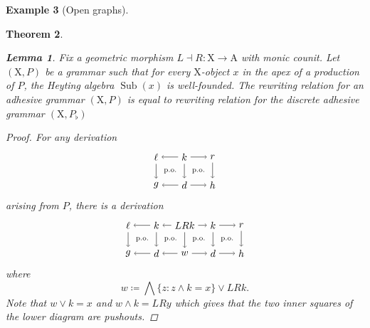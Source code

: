 \documentclass{amsart}
\newcommand{\A}{\cat{A}}
\newcommand{\X}{\cat{X}}
\newcommand{\cat}[1]{\mathrm{#1}}
\newcommand{\from}{\colon}
\DeclareMathOperator{\Sub}{Sub}
\newtheorem{theorem}{Theorem}[section]
\newtheorem{lemma}[theorem]{Lemma}
\theoremstyle{remark}
\theoremstyle{definition}
\newtheorem{example}[theorem]{Example}
\begin{document}
\begin{example}[Open graphs]
{{\begin{theorem}
\begin{lemma}
\label{lem:production-same-rewrite-relation-as-discrete}
Fix a geometric morphism $ L \dashv R \from \X \to \A $ with monic
counit. Let $ ( \X , P ) $ be a grammar such that for every
$ \X $-object $ x $ in the apex of a production of $ P $, the Heyting
algebra $ \Sub (x) $ is well-founded.  The rewriting relation for an
adhesive grammar $ ( \X , P ) $ is equal to rewriting relation for the
discrete adhesive grammar $ ( \X , P_{\flat} ) $
\end{lemma}

\begin{proof}
  For any derivation
  \[
  \begin{tikzpicture}
    \node (1t) at (0,1) {$ \ell $};
    \node (2t) at (1,1) {$ k $};
    \node (3t) at (2,1) {$ r $};
    \node (1b) at (0,0) {$ g $};
    \node (2b) at (1,0) {$ d $};
    \node (3b) at (2,0) {$ h $};
    \draw [->] (2t) to node [] {\scriptsize{$  $}} (1t);
    \draw [->] (2t) to node [] {\scriptsize{$  $}} (3t);
    \draw [->] (2b) to node [] {\scriptsize{$  $}} (1b);
    \draw [->] (2b) to node [] {\scriptsize{$  $}} (3b);
    \draw [->] (1t) to node [] {\scriptsize{$  $}} (1b);
    \draw [->] (2t) to node [] {\scriptsize{$  $}} (2b);
    \draw [->] (3t) to node [] {\scriptsize{$  $}} (3b);
    \node () at (0.5,0.5) {\scriptsize{p.o.}};
    \node () at (1.5,0.5) {\scriptsize{p.o.}};
  \end{tikzpicture}
  \]
  arising from $ P $, there is a derivation
  \[
  \begin{tikzpicture}
    \node (01) at (0,1) {$ \ell $};
    \node (11) at (1,1) {$ k $};
    \node (21) at (2,1) {$ LRk $};
    \node (31) at (3,1) {$ k $};
    \node (41) at (4,1) {$ r $};
    \node (00) at (0,0) {$ g $};
    \node (10) at (1,0) {$ d $};
    \node (20) at (2,0) {$ w $};
    \node (30) at (3,0) {$ d $};
    \node (40) at (4,0) {$ h $};
    \draw [->] (11) to node [] {\scriptsize{$  $}} (01);
    \draw [->] (21) to node [] {\scriptsize{$  $}} (11);
    \draw [->] (21) to node [] {\scriptsize{$  $}} (31);
    \draw [->] (31) to node [] {\scriptsize{$  $}} (41);
    \draw [->] (10) to node [] {\scriptsize{$  $}} (00);
    \draw [->] (20) to node [] {\scriptsize{$  $}} (10);
    \draw [->] (20) to node [] {\scriptsize{$  $}} (30);
    \draw [->] (30) to node [] {\scriptsize{$  $}} (40);
    \draw [->] (01) to node [] {\scriptsize{$  $}} (00);
    \draw [->] (11) to node [] {\scriptsize{$  $}} (10);
    \draw [->] (21) to node [] {\scriptsize{$  $}} (20);
    \draw [->] (31) to node [] {\scriptsize{$  $}} (30);
    \draw [->] (41) to node [] {\scriptsize{$  $}} (40);
    \node () at (0.5,0.5) {\scriptsize{p.o.}};
    \node () at (1.5,0.5) {\scriptsize{p.o.}};
    \node () at (2.5,0.5) {\scriptsize{p.o.}};
    \node () at (3.5,0.5) {\scriptsize{p.o.}};
  \end{tikzpicture}
  \]
  where 
  \[
    w \coloneqq
    \bigwedge \{ z \colon z \wedge k = x \} \vee LRk.
  \]
  Note that $ w \vee k = x $ and $ w \wedge k = LRy $ which gives that
  the two inner squares of the lower diagram are pushouts.
\end{proof}


\end{theorem}}}
\end{example}
\end{document}
